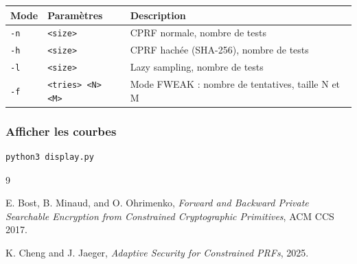 \documentclass[9pt]{extarticle}
\begin{document}
\begin{center}
\begin{tabular}{|l|l|l|}
\hline
\textbf{Mode} & \textbf{Paramètres} & \textbf{Description} \\
\hline
\texttt{-n} & \texttt{<size>} & CPRF normale, nombre de tests \\
\hline
\texttt{-h} & \texttt{<size>} & CPRF hachée (SHA-256), nombre de tests \\
\hline
\texttt{-l} & \texttt{<size>} & Lazy sampling, nombre de tests \\
\hline
\texttt{-f} & \texttt{<tries> <N> <M>} & Mode FWEAK : nombre de tentatives, taille N et M \\
\hline
\end{tabular}
\end{center}

\subsubsection*{Afficher les courbes}

\begin{verbatim}
python3 display.py
\end{verbatim}

\newpage
\appendix

\begin{thebibliography}{9}

E. Bost, B. Minaud, and O. Ohrimenko,
\textit{Forward and Backward Private Searchable Encryption from
Constrained Cryptographic Primitives},
ACM CCS 2017.

K. Cheng and J. Jaeger,
\textit{Adaptive Security for Constrained PRFs},
2025.

\end{thebibliography}
\end{document}
